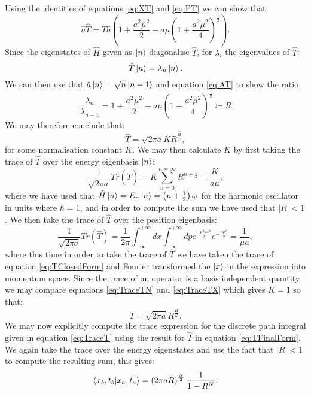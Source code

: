 \documentclass[12pt]{article}
\begin{document}
Using the identities of equations \ref{eq:XT} and \ref{eq:PT} we can show that:
\begin{equation}
	\label{eq:AT}
	\hat{a}\hat{T} = \hat{T}\hat{a}\left( 1 + \frac{a^2\mu^2}{2} - a\mu\left( 1 + \frac{a^2\mu^2}{4}\right)^\frac{1}{2} \right).
\end{equation}
Since the eigenstates of $\hat{H}$ given as $\ket{n}$ diagonalise $\hat{T}$, for $\lambda_i$ the eigenvalues of $\hat{T}$:
\begin{equation}
	\label{eq:TEigenstates}
	\hat{T}\ket{n} = \lambda_n \ket{n}.
\end{equation}
We can then use that $\hat{a}\ket{n} = \sqrt{n}\ket{n-1}$ and equation \ref{eq:AT} to show the ratio:
\begin{equation}
	\label{eq:EigenRatio}
	\frac{\lambda_n}{\lambda_{n-1}} = 1 + \frac{a^2\mu^2}{2} - a\mu\left( 1 + \frac{a^2\mu^2}{4}\right)^{\frac{1}{2}} \coloneqq R
\end{equation}
We may therefore conclude that:
\begin{equation}
	\label{eq:TWithK}
	\hat{T} = \sqrt{2\pi a}KR^{\frac{\hat{H}}{\omega}},
\end{equation}
for some normalisation constant $K$. We may then calculate $K$ by first taking the trace of $\hat{T}$ over the energy eigenbasis $\ket{n}$:
\begin{equation}
	\label{eq:TraceTN}
	\frac{1}{\sqrt{2\pi a}} Tr{\left(\hat{T}\right)} = K \sum_{n=0}^{n=\infty} R^{n+\frac{1}{2}} = \frac{K}{a\mu},
\end{equation}
where we have used that $\hat{H}\ket{n} = E_n\ket{n} = \left(n+\frac{1}{2}\right)\omega$ for the harmonic oscillator in units where $\hbar=1$, and in order to compute the sum we have used that $|R| < 1$. We then take the trace of $\hat{T}$ over the position eigenbasis:
\begin{equation}
	\label{eq:TraceTX}
	\frac{1}{\sqrt{2\pi a}} Tr{\left(\hat{T}\right)} = \frac{1}{2\pi}\int_{-\infty}^{+\infty}dx\int_{-\infty}^{+\infty}dp e^{\frac{-\mu^2ax^2}{2}}e^{-\frac{ap^2}{2}} = \frac{1}{\mu a},
\end{equation}
where this time in order to take the trace of $\hat{T}$ we have taken the trace of equation \ref{eq:TClosedForm} and Fourier transformed the $\ket{x}$ in the expression into momentum space. Since the trace of an operator is a basis independent quantity we may compare equations \ref{eq:TraceTN} and \ref{eq:TraceTX} which gives $K=1$ so that:
\begin{equation}
	\label{eq:TFinalForm}
	T = \sqrt{2\pi a} R^{\frac{\hat{H}}{\omega}}.
\end{equation}
We may now explicitly compute the trace expression for the discrete path integral given in equation \ref{eq:TraceT} using the result for $\hat{T}$ in equation \ref{eq:TFinalForm}. We again take the trace over the energy eigenstates and use the fact that $|R|<1$ to compute the resulting sum, this gives:
\begin{equation}
	\label{eq:DiscretePathIntegral}
	\braket{x_b,t_b|x_a,t_a} = \left(2\pi aR\right)^{\frac{N}{2}}\frac{1}{1-R^N}.
\end{equation}
\end{document}
